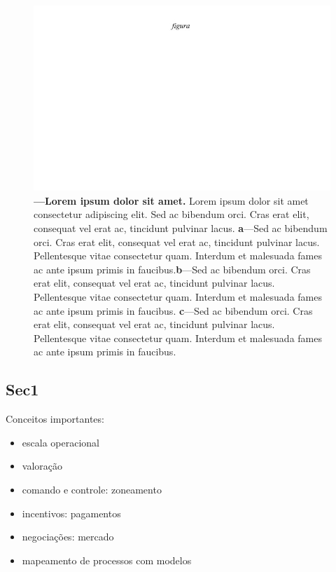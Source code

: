 \documentclass[./main.tex]{subfiles}
\begin{document}
\begin{figure}[t!] 
\centering				
\includegraphics[width=0.98\linewidth]{figs/fig_m.jpg}		
\caption[Lorem ipsum dolor sit amet]
{\textbf{---\;Lorem ipsum dolor sit amet.}
    Lorem ipsum dolor sit amet consectetur adipiscing elit. Sed ac bibendum orci. Cras erat elit, consequat vel erat ac, tincidunt pulvinar lacus. \;\textbf{a}\;---\;Sed ac bibendum orci. Cras erat elit, consequat vel erat ac, tincidunt pulvinar lacus. Pellentesque vitae consectetur quam. Interdum et malesuada fames ac ante ipsum primis in faucibus.\;\textbf{b}\;---\;Sed ac bibendum orci. Cras erat elit, consequat vel erat ac, tincidunt pulvinar lacus. Pellentesque vitae consectetur quam. Interdum et malesuada fames ac ante ipsum primis in faucibus. \;\textbf{c}\;---\;Sed ac bibendum orci. Cras erat elit, consequat vel erat ac, tincidunt pulvinar lacus. Pellentesque vitae consectetur quam. Interdum et malesuada fames ac ante ipsum primis in faucibus.
}
\label{fig:eco:watersheds} 		
\end{figure}

\subsection{Sec1}

Conceitos importantes:
\begin{itemize}
    \item         escala operacional
    \item valoração
    \item comando e controle: zoneamento 
    \item incentivos: pagamentos
    \item negociações: mercado
    \item mapeamento de processos com modelos
\end{itemize} 
\end{document}
